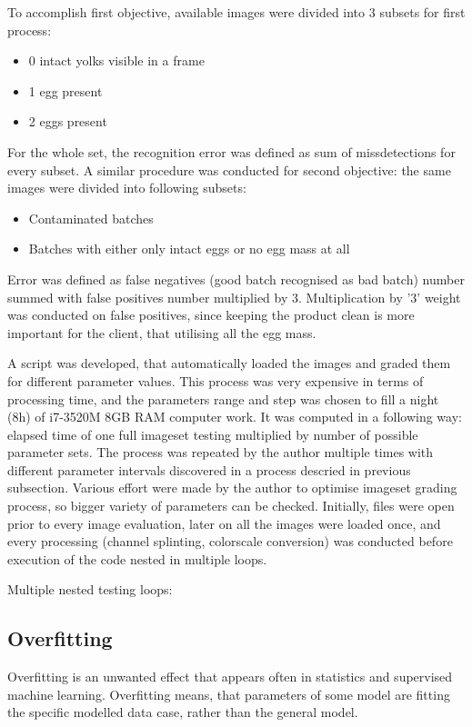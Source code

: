 \documentclass[12pt,twoside,a4paper]{article}
\begin{document}
To accomplish first objective, available images were divided into 3 subsets for first process:
\begin{itemize}
\item 0 intact yolks visible in a frame
\item 1 egg present
\item 2 eggs present
\end{itemize}
For the whole set, the recognition error was defined  as sum of missdetections for every subset.
A similar procedure was conducted for second objective: the same images were divided into following subsets:
\begin{itemize}
\item Contaminated batches
\item Batches with either only intact eggs or no egg mass at all
\end{itemize}
Error was defined as false negatives (good batch recognised as bad batch) number summed with false positives number multiplied by 3.
Multiplication by '3' weight was conducted on false positives, since keeping the product clean is more important for the client, that utilising all the egg mass. 

A script was developed, that automatically loaded the images and graded them for different parameter values.
This process was very expensive in terms of processing time, and the parameters range and step was chosen to fill a night (8h) of i7-3520M 8GB RAM computer work.
It was computed in a following way: elapsed time of one full imageset testing multiplied by number of possible parameter sets.
The process was repeated by the author multiple times with different parameter intervals discovered in a process descried in previous subsection.
Various effort were made by the author to optimise imageset grading process, so bigger variety of parameters can be checked.
Initially, files were open prior to every image evaluation, later on all the images were loaded once, and every processing (channel splinting, colorscale conversion) was conducted before execution of the code nested in multiple loops.

Multiple nested testing loops:


\newpage

\subsection{Overfitting}
Overfitting is an unwanted effect that appears often in statistics and supervised machine learning.
Overfitting means, that parameters of some model are fitting the specific modelled data case, rather than the general model.
\end{document}

